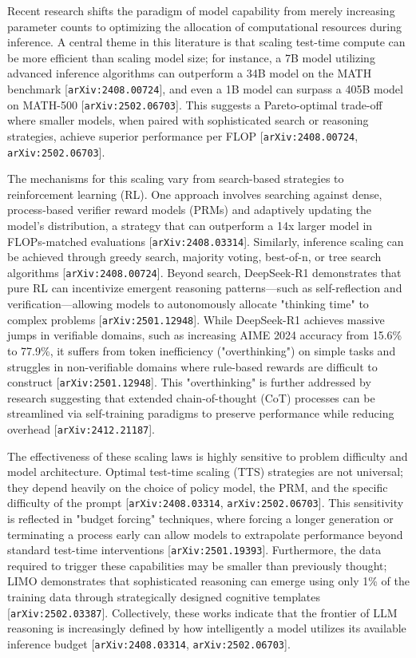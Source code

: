 \documentclass[11pt]{article}
\begin{document}
Recent research shifts the paradigm of model capability from merely increasing parameter counts to optimizing the allocation of computational resources during inference. A central theme in this literature is that scaling test-time compute can be more efficient than scaling model size; for instance, a 7B model utilizing advanced inference algorithms can outperform a 34B model on the MATH benchmark [\texttt{arXiv:2408.00724}], and even a 1B model can surpass a 405B model on MATH-500 [\texttt{arXiv:2502.06703}]. This suggests a Pareto-optimal trade-off where smaller models, when paired with sophisticated search or reasoning strategies, achieve superior performance per FLOP [\texttt{arXiv:2408.00724}, \texttt{arXiv:2502.06703}].

The mechanisms for this scaling vary from search-based strategies to reinforcement learning (RL). One approach involves searching against dense, process-based verifier reward models (PRMs) and adaptively updating the model's distribution, a strategy that can outperform a 14x larger model in FLOPs-matched evaluations [\texttt{arXiv:2408.03314}]. Similarly, inference scaling can be achieved through greedy search, majority voting, best-of-n, or tree search algorithms [\texttt{arXiv:2408.00724}]. Beyond search, DeepSeek-R1 demonstrates that pure RL can incentivize emergent reasoning patterns—such as self-reflection and verification—allowing models to autonomously allocate "thinking time" to complex problems [\texttt{arXiv:2501.12948}]. While DeepSeek-R1 achieves massive jumps in verifiable domains, such as increasing AIME 2024 accuracy from 15.6\% to 77.9\%, it suffers from token inefficiency ("overthinking") on simple tasks and struggles in non-verifiable domains where rule-based rewards are difficult to construct [\texttt{arXiv:2501.12948}]. This "overthinking" is further addressed by research suggesting that extended chain-of-thought (CoT) processes can be streamlined via self-training paradigms to preserve performance while reducing overhead [\texttt{arXiv:2412.21187}].

The effectiveness of these scaling laws is highly sensitive to problem difficulty and model architecture. Optimal test-time scaling (TTS) strategies are not universal; they depend heavily on the choice of policy model, the PRM, and the specific difficulty of the prompt [\texttt{arXiv:2408.03314}, \texttt{arXiv:2502.06703}]. This sensitivity is reflected in "budget forcing" techniques, where forcing a longer generation or terminating a process early can allow models to extrapolate performance beyond standard test-time interventions [\texttt{arXiv:2501.19393}]. Furthermore, the data required to trigger these capabilities may be smaller than previously thought; LIMO demonstrates that sophisticated reasoning can emerge using only 1\% of the training data through strategically designed cognitive templates [\texttt{arXiv:2502.03387}]. Collectively, these works indicate that the frontier of LLM reasoning is increasingly defined by how intelligently a model utilizes its available inference budget [\texttt{arXiv:2408.03314}, \texttt{arXiv:2502.06703}].
\end{document}
